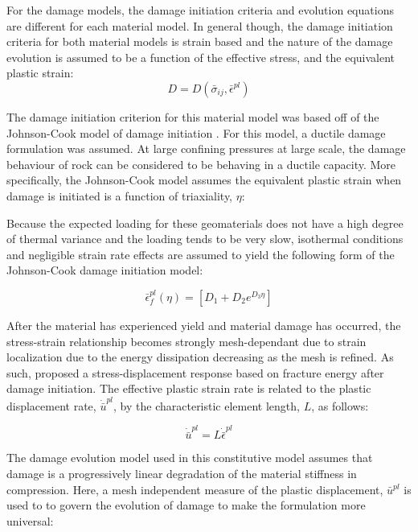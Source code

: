 For the damage models, the damage initiation criteria and evolution equations are different for each material model. In general though, the damage initiation criteria for both material models is strain based and the nature of the damage evolution is assumed to be a function of the effective stress, and the equivalent plastic strain:
\begin{equation}
D=D\left(\bar{\sigma}_{ij},\bar{\epsilon}^{pl}\right)\label{eqn:const8}
\end{equation}


The damage initiation criterion for this material model was based off of the Johnson-Cook model of damage initiation \cite{Johnson_1985}. For this model, a ductile damage formulation was assumed. At large confining pressures at large scale, the damage behaviour of rock can be considered to be behaving in a ductile capacity. More specifically, the Johnson-Cook model assumes the equivalent plastic strain when damage is initiated is a function of triaxiality, $\eta$:

Because the expected loading for these geomaterials does not have a high degree of thermal variance and the loading tends to be very slow, isothermal conditions and negligible strain rate effects are assumed to yield the following form of the Johnson-Cook damage initiation model:

\begin{equation}
\bar{\epsilon}_{f}^{pl}\left(\eta\right)=\left[D_{1}+D_{2}e^{D_{3}\eta}\right]\label{eqn:druc8}
\end{equation}

After the material has experienced yield and material damage has occurred, the stress-strain relationship becomes strongly mesh-dependant due to strain localization due to the energy dissipation decreasing as the mesh is refined. As such, \citet{Hillerborg_1976} proposed a stress-displacement response based on fracture energy after damage initiation. The effective plastic strain rate is related to the plastic displacement rate, $\dot{\bar{u}}^{pl}$, by the characteristic element length, $L$, as follows:

\begin{equation}
\dot{\bar{u}}^{pl}=L\dot{\bar{\epsilon}}^{pl}\label{eqn:druc9}
\end{equation}

The damage evolution model used in this constitutive model assumes that damage is a progressively linear degradation of the material stiffness in compression.  Here, a mesh independent measure of the plastic displacement, $\bar{u}^{pl}$ is used to to govern the evolution of damage to make the formulation more universal:


